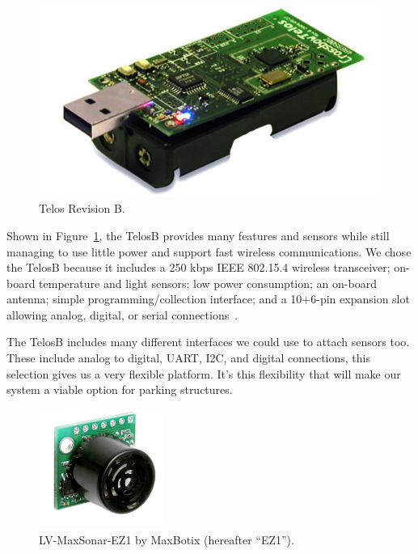 \documentclass{acm_proc}
\begin{document}
\begin{figure}
    \begin{center}
		\includegraphics[width=\columnwidth]{figures/telosb}
	\end{center}
	\caption{Telos Revision B.}
	\label{fig:telosb}
\end{figure}

Shown in Figure~\ref{fig:telosb}, the TelosB provides many
features and sensors while still managing to use little power and support
fast wireless communications.  We chose the TelosB because it includes a
250 kbps IEEE 802.15.4 wireless transceiver; on-board temperature and light
sensors; low power consumption; an on-board antenna; simple
programming/collection interface; and a 10+6-pin expansion slot allowing
analog, digital, or serial connections~\cite{moteiv:telosb}.

The TelosB includes many different interfaces we could use to attach
sensors too.
These include analog to digital, UART, I2C, and digital connections, this
selection gives us a very flexible platform.
It's this flexibility that will make our system a viable option for parking
structures.

\begin{figure}
    \begin{center}
		\includegraphics[height=1.5in]{figures/range_finder}
	\end{center}
	\caption{LV-MaxSonar\textsuperscript{\textregistered}-EZ1\textsuperscript{\texttrademark}
	by MaxBotix\textsuperscript{\textregistered} (hereafter ``EZ1'').}
	\label{fig:range_finder}
\end{figure}
\end{document}
